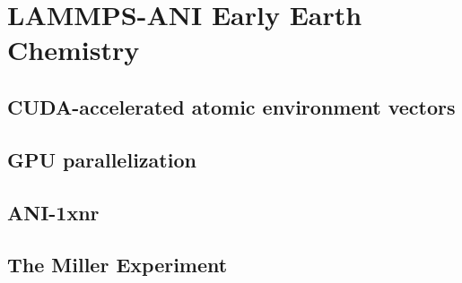 \chapter{LAMMPS-ANI Early Earth Chemistry} 

\section{CUDA-accelerated atomic environment vectors}

\section{GPU parallelization}

\section{ANI-1xnr}

\section{The Miller Experiment}
